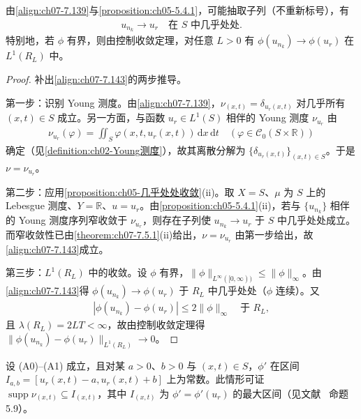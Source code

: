 \documentclass[../../main.tex]{subfiles}%
\begin{document}
\begin{remark}\label{remark:ch07-7.5.2}
由\eqref{align:ch07-7.139}与\cref{proposition:ch05-5.4.1}，可能抽取子列（不重新标号），有
\begin{align}
u_{n_k}\to u_r\quad\text{在 }S\text{ 中几乎处处}. \label{align:ch07-7.143}
\end{align}
特别地，若 $\phi$ 有界，则由控制收敛定理，对任意 $L>0$ 有 $\phi(u_{n_k})\to\phi(u_r)$ 在 $L^1(R_L)$ 中。
\end{remark}

\begin{proof}
补出\eqref{align:ch07-7.143}的两步推导。

第一步：识别 Young 测度。由\eqref{align:ch07-7.139}，$\nu_{(x,t)}=\delta_{u_r(x,t)}$ 对几乎所有 $(x,t)\in S$ 成立。另一方面，与函数 $u_r\in L^1(S)$ 相伴的 Young 测度 $\nu_{u_r}$ 由
\begin{align*}
\nu_{u_r}(\varphi)=\iint_S\varphi(x,t,u_r(x,t))\,\mathrm{d}x\,\mathrm{d}t\quad(\varphi\in\mathcal{C}_0(S\times\mathbb{R}))
\end{align*}
确定（见\cref{definition:ch02-Young测度}），故其离散分解为 $\{\delta_{u_r(x,t)}\}_{(x,t)\in S}$。于是 $\nu=\nu_{u_r}$。

第二步：应用\cref{proposition:ch05-几乎处处收敛}(ii)。取 $X=S$、$\mu$ 为 $S$ 上的 Lebesgue 测度、$Y=\mathbb{R}$、$u=u_r$。由\cref{proposition:ch05-5.4.1}(ii)，若与 $\{u_{n_k}\}$ 相伴的 Young 测度序列窄收敛于 $\nu_{u_r}$，则存在子列使 $u_{n_k}\to u_r$ 于 $S$ 中几乎处处成立。而窄收敛性已由\cref{theorem:ch07-7.5.1}(ii)给出，$\nu=\nu_{u_r}$ 由第一步给出，故\eqref{align:ch07-7.143}成立。

第三步：$L^1(R_L)$ 中的收敛。设 $\phi$ 有界，$\|\phi\|_{L^\infty([0,\infty))}\leqslant\|\phi\|_\infty$。由\eqref{align:ch07-7.143}得 $\phi(u_{n_k})\to\phi(u_r)$ 于 $R_L$ 中几乎处处（$\phi$ 连续）。又
\begin{align*}
|\phi(u_{n_k})-\phi(u_r)|\leqslant2\|\phi\|_\infty\quad\text{于 }R_L,
\end{align*}
且 $\lambda(R_L)=2LT<\infty$，故由控制收敛定理得 $\|\phi(u_{n_k})-\phi(u_r)\|_{L^1(R_L)}\to0$。
\end{proof}

\begin{remark}\label{remark:ch07-7.5.3}
设 (A0)--(A1) 成立，且对某 $a>0$、$b>0$ 与 $(x,t)\in S$，$\phi'$ 在区间 $I_{a,b}=[u_r(x,t)-a,u_r(x,t)+b]$ 上为常数。此情形可证 $\operatorname{supp}\nu_{(x,t)}\subseteq I_{(x,t)}$，其中 $I_{(x,t)}$ 为 $\phi'=\phi'(u_r)$ 的最大区间（见文献~\cite{ref18} 命题 5.9）。
\end{remark}
\end{document}
